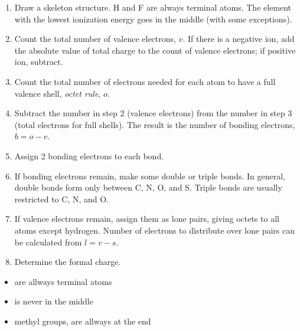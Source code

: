 \documentclass[../mit-general-chemistry.tex]{subfiles}
\begin{document}
\begin{enumerate}
\item Draw a skeleton structure. H and F are always terminal
  atoms. The element with the lowest ionization energy goes in the
  middle (with some exceptions).

\item Count the total number of valence electrons, $v$. If there is a
  negative ion, add the absolute value of total charge to the count of
  valence electrons; if positive ion, subtract.

\item Count the total number of electrons needed for each atom to have a full
  valence shell, {\em octet rule}, $o$.

\item Subtract the number in step 2 (valence electrons) from the
  number in step 3 (total electrons for full shells). The result is
  the number of bonding electrons, $b = o - v$.

\item Assign 2 bonding electrons to each bond.

\item If bonding electrons remain, make some double or triple
  bonds. In general, double bonds form only between C, N, O, and
  S. Triple bonds are usually restricted to C, N, and O.

\item If valence electrons remain, assign them as lone pairs, giving
  octets to all atoms except hydrogen. Number of electrons to
  distribute over lone pairs can be calculated from $l = v - s$.

\item Determine the formal charge.
\end{enumerate}


\begin{remark}
  \begin{itemize}
  \item {} are allways terminal atoms
  \item {} is never in the middle
  \item methyl groups,  are allways at the end
  \end{itemize}
\end{remark}
\end{document}
